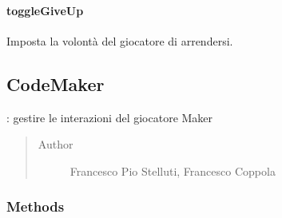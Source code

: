 \documentclass[letterpaper,10pt,italian]{sphinxmanual}
\begin{document}
\paragraph{toggleGiveUp}
\label{\detokenize{source/it/unicam/cs/pa/mastermind/players/CodeBreaker:togglegiveup}}

\begin{fulllineitems}
\label{\detokenize{source/it/unicam/cs/pa/mastermind/players/CodeBreaker:it.unicam.cs.pa.mastermind.players.CodeBreaker.toggleGiveUp()}}
Imposta la volontà del giocatore  di arrendersi.

\end{fulllineitems}



\subsection{CodeMaker}
\label{\detokenize{source/it/unicam/cs/pa/mastermind/players/CodeMaker:codemaker}}\label{\detokenize{source/it/unicam/cs/pa/mastermind/players/CodeMaker::doc}}

\begin{fulllineitems}
\label{\detokenize{source/it/unicam/cs/pa/mastermind/players/CodeMaker:it.unicam.cs.pa.mastermind.players.CodeMaker}}
: gestire le interazioni del giocatore Maker
\begin{quote}\begin{description}
\item[{Author}] \leavevmode
Francesco Pio Stelluti, Francesco Coppola

\end{description}\end{quote}

\end{fulllineitems}



\subsubsection{Methods}
\label{\detokenize{source/it/unicam/cs/pa/mastermind/players/CodeMaker:methods}}
\end{document}
